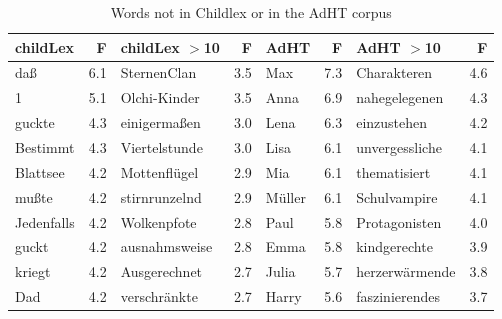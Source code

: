 \documentclass[manuscript]{stjour}
\begin{document}
\begin{table}[!htbp]
\caption{Words not in Childlex or in the AdHT corpus}
\centering
\begin{tabular}{lrlrlrlr}
  \hline
childLex & F & childLex $>$10 & F & AdHT & F & AdHT $>$10 & F \\ 
  \hline
daß & 6.1 & SternenClan & 3.5 & Max & 7.3 & Charakteren & 4.6 \\ 
  1 & 5.1 & Olchi-Kinder & 3.5 & Anna & 6.9 & nahegelegenen & 4.3 \\ 
  guckte & 4.3 & einigermaßen & 3.0 & Lena & 6.3 & einzustehen & 4.2 \\ 
  Bestimmt & 4.3 & Viertelstunde & 3.0 & Lisa & 6.1 & unvergessliche & 4.1 \\ 
  Blattsee & 4.2 & Mottenflügel & 2.9 & Mia & 6.1 & thematisiert & 4.1 \\ 
  mußte & 4.2 & stirnrunzelnd & 2.9 & Müller & 6.1 & Schulvampire & 4.1 \\ 
  Jedenfalls & 4.2 & Wolkenpfote & 2.8 & Paul & 5.8 & Protagonisten & 4.0 \\ 
  guckt & 4.2 & ausnahmsweise & 2.8 & Emma & 5.8 & kindgerechte & 3.9 \\ 
  kriegt & 4.2 & Ausgerechnet & 2.7 & Julia & 5.7 & herzerwärmende & 3.8 \\ 
  Dad & 4.2 & verschränkte & 2.7 & Harry & 5.6 & faszinierendes & 3.7 \\ 
   \hline
\end{tabular}
\label{words-adht}
\end{table}
\end{document}
